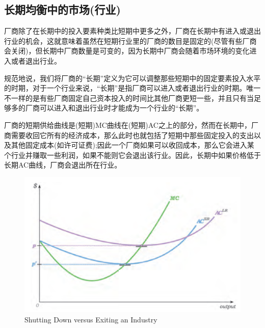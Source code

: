 \documentclass{article}
\begin{document}
\subsection{长期均衡中的市场(行业)}

厂商除了在长期中的投入要素种类比短期中更多之外，厂商在长期中有进入或退出行业的机会，这就意味着虽然在短期行业里的厂商的数目是固定的(尽管有些厂商会关闭)，但长期中厂商数量是可变的，因为长期中厂商会随着市场环境的变化进入或者退出行业。

规范地说，我们将厂商的“长期”定义为它可以调整那些短期中的固定要素投入水平的时期，对于一个行业来说，“长期”是指厂商可以进入或者退出行业的时期。唯一不一样的是有些厂商固定自己资本投入的时间比其他厂商更短一些，并且只有当足够多的厂商可以进入和退出行业时才能成为一个行业的“长期”。

厂商的短期供给曲线是(短期)MC曲线在(短期)AC之上的部分，然而在长期中，厂商需要收回它所有的经济成本，那么此时也就包括了短期中那些固定投入的支出以及其他固定成本(如许可证费);因此一个厂商如果可以收回成本，那么它会进入某个行业并赚取一些利润，如果不能则它会退出该行业。因此，长期中如果价格低于长期AC曲线，厂商会退出所在行业。

\begin{figure}[H] %
	\centering %
	\includegraphics[width=1\textwidth]{14_1} %
	\caption{Shutting Down versus Exiting an Industry} %
	\label{Fig.main2} %
\end{figure}

\hspace*{\fill}
\end{document}
